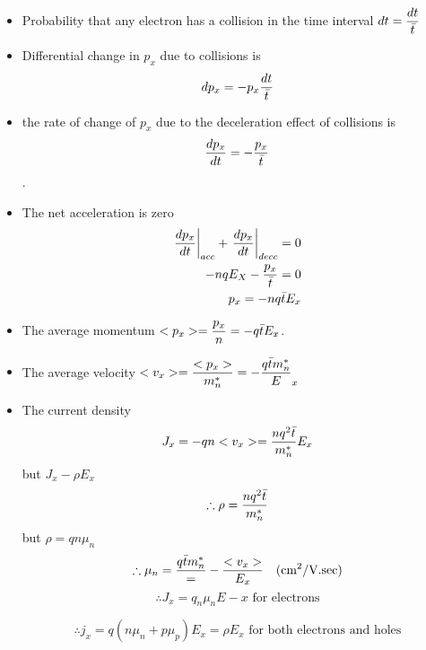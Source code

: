 \documentclass[12pt,a4paper]{article}
\begin{document}
\begin{large}
{\begin{itemize}
%
\begin{align*}
 -\frac{dN(t)}{dt} \propto N(t) \quad ,\quad
 -\frac{dN(t)}{dt} = \frac{1}{\Bar{t}} N(t) \quad ,\quad
 N(t) = N_0 e^{-t/\Bar{t}}\\
\end{align*}




$N(t)$ : the number of electrons which have not undergo a collision by time $t$.
$N_0$ : group of electrons at $t=0$. 
$\Bar{t}$ : mean time between scattering events.

\item Probability that any electron has a collision in the time interval 
$dt = \dfrac{dt}{\Bar{t}}$
\item Differential change in $p_x$ due to collisions is $$dp_x=-p_x\frac{dt}{\Bar{t}}$$

\item the rate of change of $p_x$ due to the deceleration effect of collisions is $$\frac{dp_x}{dt}=-\frac{p_x}{\Bar{t}}$$.

\item The net acceleration is zero 
\begin{align*}
\left. \frac{dp_x}{dt}\right|_{acc} + \left. \frac{dp_x}{dt}\right|_{decc} = 0\\
-nqE_X - \frac{p_x}{\Bar{t}} = 0\\
p_x = -nq\Bar{t}E_x
\end{align*} 

\item The average momentum $\displaystyle <p_x> = \frac{p_x}{n} = -q\Bar{t}E_x$.

\item The average velocity $\displaystyle <v_x> = \frac{<p_x>}{m^*_n} = -\frac{q\Bar{t}{m^*_n}}E_x$

\item The current density $$ J_x = -qn<v_x> = \frac{nq^2\Bar{t}}{m^*_n}E_x$$ but $ J_x - \rho E_x$ 
$$\therefore \rho = \frac{nq^2\Bar{t}}{m^*_n}$$
but $\rho = qn\mu_n$
$$\therefore \mu_n = \frac{q\Bar{t}{m^*_n}}= -\frac{<v_x>}{E_x} \quad \text{(cm\textsuperscript{2}/V.sec)}$$
$$\therefore J_x = q_n \mu_n E-x \text{ for electrons}$$

$$\therefore j_x = q(n\mu_n+p\mu_p)E_x = \rho E_x \text{ for both electrons and holes}$$


\end{itemize}
}

\end{large}
\end{document}
